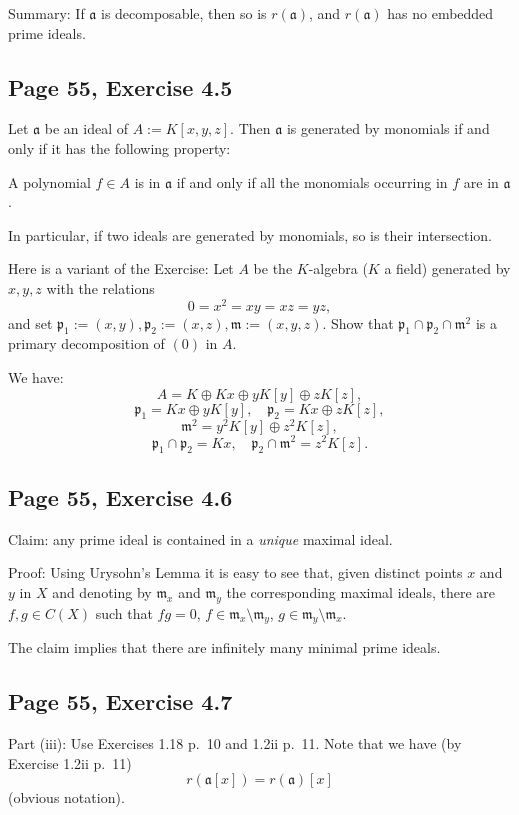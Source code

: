\documentclass[parskip=half,fontsize=12pt]{scrartcl}%
\newcommand{\mf}{\mathfrak}
\newcommand{\aaa}{\mf a}
\newcommand{\mmm}{\mf m}
\newcommand{\ppp}{\mf p}
\begin{document}
Summary: If $\aaa$ is decomposable, then so is $r(\aaa)$, and $r(\aaa)$ has no embedded prime ideals. 

\subsection{Page 55, Exercise 4.5}%

Let $\aaa$ be an ideal of $A:=K[x,y,z]$. Then $\aaa$ is generated by monomials if and only if it has the following property:

A polynomial $f\in A$ is in $\aaa$ if and only if all the monomials occurring in $f$ are in $\aaa$.

In particular, if two ideals are generated by monomials, so is their intersection.

Here is a variant of the Exercise: Let $A$ be the $K$-algebra ($K$ a field) generated by $x,y,z$ with the relations 
$$
0=x^2=xy=xz=yz,
$$ 
and set $\ppp_1:=(x,y),\ppp_2:=(x,z),\mmm:=(x,y,z)$. Show that $\ppp_1\cap\ppp_2\cap\mmm^2$ is a primary decomposition of $(0)$ in $A$.

We have:
$$
A=K\oplus Kx\oplus yK[y]\oplus zK[z],
$$ 
$$
\ppp_1=Kx\oplus yK[y],\quad\ppp_2=Kx\oplus zK[z],
$$ 
$$
\mmm^2=y^2K[y]\oplus z^2K[z],
$$ 
$$ 
\ppp_1\cap\ppp_2=Kx,\quad\ppp_2\cap\mmm^2=z^2K[z].
$$

\subsection{Page 55, Exercise 4.6}%

Claim: any prime ideal is contained in a \emph{unique} maximal ideal.

Proof: Using Urysohn's Lemma it is easy to see that, given distinct points $x$ and $y$ in $X$ and denoting by $\mmm_x$ and $\mmm_y$ the corresponding maximal ideals, there are $f,g\in C(X)$ such that $fg=0$, $f\in\mmm_x\setminus\mmm_y$, $g\in\mmm_y\setminus\mmm_x$. 

The claim implies that there are infinitely many minimal prime ideals. %

\subsection{Page 55, Exercise 4.7}\label{5547}%

Part (iii): Use Exercises 1.18 p.~10 and 1.2ii p.~11. Note that we have (by Exercise 1.2ii p.~11)
\begin{equation}\label{rax}
r(\aaa[x])=r(\aaa)[x]
\end{equation}
(obvious notation).
\end{document}
